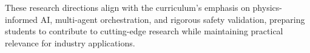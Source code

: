 \documentclass[12pt,a4paper]{article}
\begin{document}
These research directions align with the curriculum's emphasis on physics-informed AI, multi-agent orchestration, and rigorous safety validation, preparing students to contribute to cutting-edge research while maintaining practical relevance for industry applications.







\end{document}

